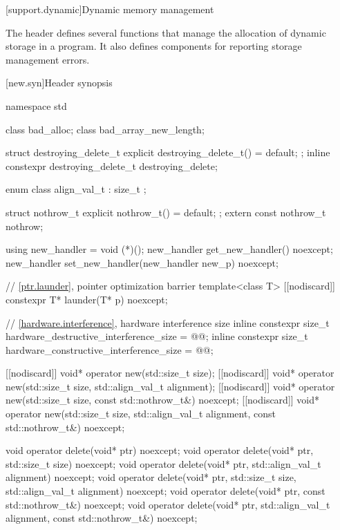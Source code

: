 
[support.dynamic]{Dynamic memory management}

\pnum
The header  defines several
functions that manage the allocation of dynamic storage in a program.
It also defines components for reporting storage management errors.

[new.syn]{Header  synopsis}

%
%
%
%
%
\begin{codeblock}
namespace std {
  class bad_alloc;
  class bad_array_new_length;

  struct destroying_delete_t {
    explicit destroying_delete_t() = default;
  };
  inline constexpr destroying_delete_t destroying_delete{};

  enum class align_val_t : size_t {};

  struct nothrow_t { explicit nothrow_t() = default; };
  extern const nothrow_t nothrow;

  using new_handler = void (*)();
  new_handler get_new_handler() noexcept;
  new_handler set_new_handler(new_handler new_p) noexcept;

  // \ref{ptr.launder}, pointer optimization barrier
  template<class T> [[nodiscard]] constexpr T* launder(T* p) noexcept;

  // \ref{hardware.interference}, hardware interference size
  inline constexpr size_t hardware_destructive_interference_size = @\impdef{}@;
  inline constexpr size_t hardware_constructive_interference_size = @\impdef{}@;
}

[[nodiscard]] void* operator new(std::size_t size);
[[nodiscard]] void* operator new(std::size_t size, std::align_val_t alignment);
[[nodiscard]] void* operator new(std::size_t size, const std::nothrow_t&) noexcept;
[[nodiscard]] void* operator new(std::size_t size, std::align_val_t alignment,
                                 const std::nothrow_t&) noexcept;

void  operator delete(void* ptr) noexcept;
void  operator delete(void* ptr, std::size_t size) noexcept;
void  operator delete(void* ptr, std::align_val_t alignment) noexcept;
void  operator delete(void* ptr, std::size_t size, std::align_val_t alignment) noexcept;
void  operator delete(void* ptr, const std::nothrow_t&) noexcept;
void  operator delete(void* ptr, std::align_val_t alignment, const std::nothrow_t&) noexcept;


\end{codeblock}
